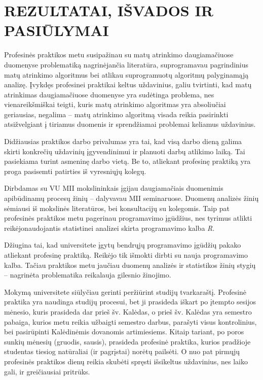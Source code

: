 
\section{REZULTATAI, IŠVADOS IR PASIŪLYMAI}
\label{rezultatai_isvados_pasiulymai}

Profesinės praktikos metu susipažinau su matų atrinkimo daugiamačiuose duomenyse problematiką nagrinėjančia literatūra, suprogramavau pagrindinius matų atrinkimo algoritmus bei atlikau suprogramuotų algoritmų palyginamąją analizę. Įvykdęs profesinei praktikai keltus uždavinius, galiu tvirtinti, kad matų atrinkimas daugiamačiuose duomenyse yra sudėtinga problema, nes vienareikšmiškai teigti, kuris matų atrinkimo algoritmas yra absoliučiai geriausias, negalima -- matų atrinkimo algoritmą visada reikia pasirinkti atsižvelgiant į tiriamus duomenis ir sprendžiamai problemai keliamus uždavinius.

Didžiausias praktikos darbo privalumas yra tai, kad visą darbo dieną galima skirti konkrečių uždavinių įgyvendinimui ir planuoti darbų atlikimo laiką. Tai pasiekiama turint asmeninę darbo vietą. Be to, atliekant profesinę praktiką yra proga pasisemti patirties iš vyresniųjų kolegų. 

Dirbdamas su VU MII mokslininkais įgijau daugiamačiais duomenimis apibūdinamų procesų žinių -- dalyvavau MII seminaruose. Duomenų analizės žinių sėmiausi iš mokslinės literatūros, bei konsultacijų su kolegomis. Taip pat profesinės praktikos metu pagerinau programavimo įgūdžius, nes tyrimus atlikti reikėjonaudojantis statistinei analizei skirta programavimo kalba \textit{R}. 

Džiugina tai, kad universitete įgytų bendrųjų programavimo įgūdžių pakako atliekant profesinę praktiką. Reikėjo tik išmokti dirbti su nauja programavimo kalba. Tačiau praktikos metu jaučiau duomenų analizės ir statistikos žinių stygių -- nagrinėta problematika reikalauja gilesnio žinojimo.

Mokymą universitete siūlyčiau gerinti peržiūrint studijų tvarkaraštį. Profesinė praktika yra naudinga studijų procesui, bet ji prasideda iškart po įtempto sesijos mėnesio, kuris prasideda dar prieš šv. Kalėdas, o prieš šv. Kalėdas yra semestro pabaiga, kurios metu reikia užbaigti semestro darbus, parašyti visus kontrolinius, bei pasirūpinti Kalėdinėmis dovanomis artimiesiems. Kitaip tariant, po poros sunkių mėnesių (gruodis, sausis), prasideda profesinė praktika, kurios pradžioje studentas tiesiog natūraliai (ir pagrįstai) norėtų pailsėti. O nuo pat pirmųjų profesinės praktikos dienų reikia skubėti spręsti išsikeltus uždavinius, nes laiko gali, ir greičiausiai pritrūks. 

